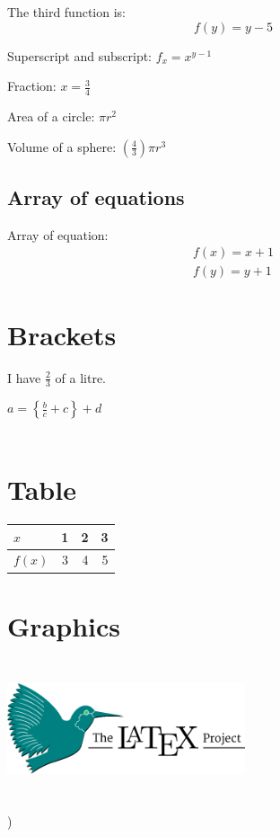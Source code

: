 \documentclass[12pt]{article}
\begin{document}
The third function is:
\begin{equation}
 f(y) = y-5
\end{equation}

Superscript and subscript: $f_x = x^{y-1}$

Fraction: $x = \frac{3}{4}$

Area of a circle: $\pi r^2$

Volume of a sphere: $(\frac{4}{3})\pi r^3$

\subsection{Array of equations}
Array of equation:
\begin{eqnarray}
f(x) = x+1\\
f(y) = y+1
\end{eqnarray}

\section{Brackets}
I have $\displaystyle\frac{2}{3}$ of a litre.

$a = \left\{\frac{b}{c}+c\right\}+d$
\\ \\
\section{Table}
\begin{table}[h]
	\centering
	\begin{tabular}{|l|c|r|r|}
	\hline
	$x$ & 1 & 2 & 3\\\hline
	$f(x)$ & 3 & 4 & 5\\\hline
\end{tabular}
\end{table}
\section{Graphics}
\begin{center}
\includegraphics[height=4cm, width=7cm]{images.png}
\end{center}
\right) 
\end{document}
